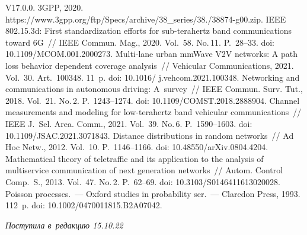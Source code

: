 \begin{multicols}{2}
{{\begin{thebibliography}{99}
V17.0.0. 3GPP, 2020. {\sf  
https://www.3gpp.org/ftp/Specs/archive/38\_series/38./38874-g00.zip}.
 IEEE 802.15.3d: First standardization efforts for  
sub-terahertz band communications toward 6G~// IEEE Commun. Mag., 2020. 
Vol.~58. No.\,11. P.~28--33. doi: 10.1109/MCOM.001.2000273.
 Multi-lane urban mmWave V2V 
networks: A path loss behavior dependent coverage analysis~// Vehicular Communications, 
2021. Vol.~30. Art.~100348. 11~p. doi: 10.1016/ j.vehcom.2021.100348.
 Networking and communications in autonomous driving: 
A~survey~// IEEE Commun. Surv. Tut., 2018. Vol.~21. No.\,2. P.~1243--1274. doi: 
10.1109/COMST.2018.2888904.
Channel measurements and modeling for low-terahertz band vehicular communications~// IEEE 
J.~Sel. Area. Comm., 2021. Vol.~39. No.\,6. P.~1590--1603. doi: 
10.1109/JSAC.2021.3071843.
 Distance distributions in random networks~//  Ad Hoc Netw., 
2012. Vol.~10. P.~1146--1166. doi: 10.48550/arXiv.0804.4204. 
 Mathematical theory of teletraffic and 
its application to the analysis of multiservice communication of next generation networks~// 
Autom. Control Comp.~S., 2013. Vol.~47. No.\,2. P.~62--69. doi: 
10.3103/S0146411613020028.
 Poisson processes.~--- Oxford studies in probability ser.~--- Claredon Press, 1993. 112~p. doi: 
10.1002/0470011815.B2A07042.
\end{thebibliography}

 }
 }

\end{multicols}

\vspace*{-6pt}

\hfill{\small\textit{Поступила в~редакцию 15.10.22}}



\newpage

\vspace*{-28pt}



